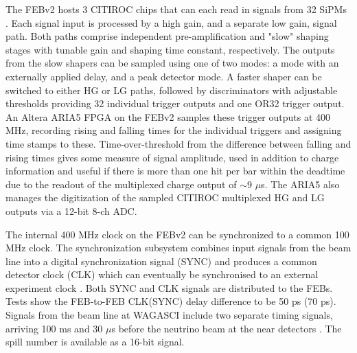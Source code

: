 The FEBv2 hosts 3 CITIROC chips that can each read in signals from 32 SiPMs \cite{Fleury:2014hfa}. Each signal input is processed by a high gain, and a separate low gain, signal path. Both paths comprise independent pre-amplification and "slow" shaping stages with tunable gain and shaping time constant, respectively. The outputs from the slow shapers can be sampled using one of two modes: a mode with an externally applied delay, and a peak detector mode. A faster shaper can be switched to either HG or LG paths, followed by discriminators with adjustable thresholds providing 32 individual trigger outputs and one OR32 trigger output. An Altera ARIA5 FPGA on the FEBv2 samples these trigger outputs at 400 MHz, recording rising and falling times for the individual triggers and assigning time stamps to these. Time-over-threshold from the difference between falling and rising times gives some measure of signal amplitude, used in addition to charge information and useful if there is more than one hit per bar within the deadtime due to the readout of the multiplexed charge output of $\sim9$ $\mu$s. The ARIA5 also manages the digitization of the sampled CITIROC multiplexed HG and LG outputs via a 12-bit 8-ch ADC. 


The internal 400 MHz clock on the FEBv2 can be synchronized to a common 100 MHz clock. The synchronization subsystem combines input signals from the beam line into a digital synchronization signal (SYNC) and produces a common detector clock (CLK) which can eventually be synchronised to an external experiment clock \cite{synchro}. Both SYNC and CLK signals are distributed to the FEBs. Tests show the FEB-to-FEB CLK(SYNC) delay difference to be 50 ps (70 ps). Signals from the beam line at WAGASCI include two separate timing signals, arriving 100 ms and 30 $\mu$s before the neutrino beam at the near detectors \cite{wagasci_elec}. The spill number is available as a 16-bit signal. 

